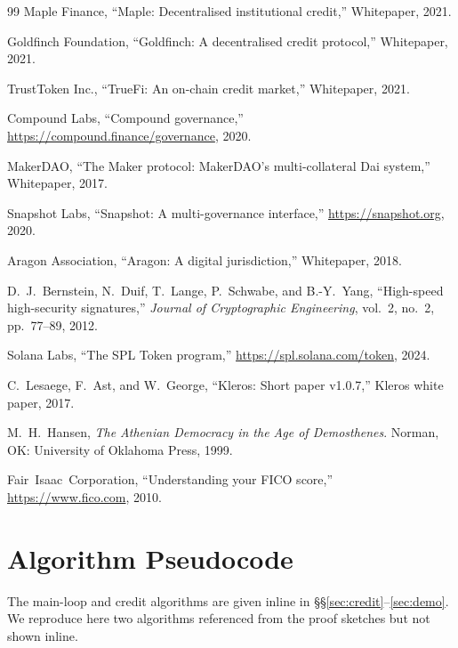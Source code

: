 \documentclass[10pt,conference,letterpaper]{IEEEtran}
\theoremstyle{definition}
\begin{document}
\begin{thebibliography}{99}
Maple Finance,
``Maple: Decentralised institutional credit,''
Whitepaper, 2021.

Goldfinch Foundation,
``Goldfinch: A decentralised credit protocol,''
Whitepaper, 2021.

TrustToken Inc.,
``TrueFi: An on-chain credit market,''
Whitepaper, 2021.

Compound Labs,
``Compound governance,''
\url{https://compound.finance/governance}, 2020.

MakerDAO,
``The Maker protocol: MakerDAO's multi-collateral Dai system,''
Whitepaper, 2017.

Snapshot Labs,
``Snapshot: A multi-governance interface,''
\url{https://snapshot.org}, 2020.

Aragon Association,
``Aragon: A digital jurisdiction,''
Whitepaper, 2018.

D.~J.~Bernstein, N.~Duif, T.~Lange, P.~Schwabe, and B.-Y.~Yang,
``High-speed high-security signatures,''
\emph{Journal of Cryptographic Engineering}, vol.~2, no.~2,
pp.~77--89, 2012.

Solana Labs,
``The SPL Token program,''
\url{https://spl.solana.com/token}, 2024.

C.~Lesaege, F.~Ast, and W.~George,
``Kleros: Short paper v1.0.7,''
Kleros white paper, 2017.

M.~H.~Hansen,
\emph{The Athenian Democracy in the Age of Demosthenes}.
Norman, OK: University of Oklahoma Press, 1999.

Fair~Isaac~Corporation,
``Understanding your FICO score,''
\url{https://www.fico.com}, 2010.

\end{thebibliography}

\appendix

\section{Algorithm Pseudocode}\label{app:pseudo}

The main-loop and credit algorithms are given inline in
\S\S\ref{sec:credit}--\ref{sec:demo}. We reproduce here two algorithms
referenced from the proof sketches but not shown inline.
\end{document}
